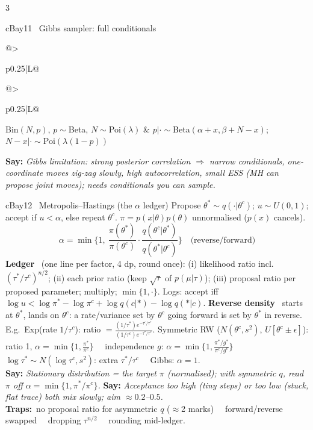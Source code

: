 \documentclass{article}
\newcommand{\h}[1]{{\bfseries #1}\ }
\newcommand{\say}[1]{{\color{cMC!75!black}\textbf{Say:}} \emph{#1}}
\newcommand{\trap}{{\color{cBay}\textbf{Traps:}}\ }
\newcommand{\sep}{\ \textbullet\ }
\begin{document}
\begin{multicols*}{3}
\begin{tb}{cBay}{11 \textbullet\ Gibbs sampler: full conditionals}
\begin{tabularx}{\linewidth}{@{}>{\raggedright\arraybackslash}p{0.25\linewidth}|L@{}}
\end{tabularx}\par\nointerlineskip
\begin{tabularx}{\linewidth}{@{}>{\raggedright\arraybackslash}p{0.25\linewidth}|L@{}}
Bin$(N,p)$, $p\sim$Beta, $N\sim$Poi$(\lambda)$ & $p|\cdot\sim$Beta$(\alpha+x,\beta+N-x)$; $N-x|\cdot\sim$Poi$(\lambda(1-p))$\\
\end{tabularx}
\say{Gibbs limitation: strong posterior correlation $\Rightarrow$ narrow conditionals, one-coordinate moves zig-zag slowly, high autocorrelation, small ESS (MH can propose joint moves); needs conditionals you can sample.}
\end{tb}

\begin{tb}{cBay}{12 \textbullet\ Metropolis--Hastings (the $\alpha$ ledger)}
Propose $\theta^*\sim q(\cdot|\theta^c)$; $u\sim U(0,1)$; accept if $u<\alpha$, else repeat $\theta^c$. $\pi=p(x|\theta)p(\theta)$ unnormalised ($p(x)$ cancels).
\[\alpha=\min\Big\{1,\ \frac{\pi(\theta^*)}{\pi(\theta^c)}\cdot\frac{q(\theta^c|\theta^*)}{q(\theta^*|\theta^c)}\Big\}\quad\text{(reverse/forward)}\]
\h{Ledger} (one line per factor, 4 dp, round once): (i) likelihood ratio incl.\ $(\tau^*/\tau^c)^{n/2}$; (ii) each prior ratio (keep $\sqrt\tau$ of $p(\mu|\tau)$); (iii) proposal ratio per proposed parameter; multiply; $\min\{1,\cdot\}$. Logs: accept iff $\log u<\log\pi^*-\log\pi^c+\log q(c|*)-\log q(*|c)$.
\h{Reverse density} starts at $\theta^*$, lands on $\theta^c$: a rate/variance set by $\theta^c$ going forward is set by $\theta^*$ in reverse. E.g.\ Exp(rate $1/\tau^c$): ratio $=\frac{(1/\tau^*)e^{-\tau^c/\tau^*}}{(1/\tau^c)e^{-\tau^*/\tau^c}}$.
Symmetric RW ($N(\theta^c,s^2)$, $U[\theta^c\pm\epsilon]$): ratio 1, $\alpha=\min\{1,\frac{\pi^*}{\pi^c}\}$ \sep independence $g$: $\alpha=\min\{1,\frac{\pi^*/g^*}{\pi^c/g^c}\}$ \sep $\log\tau^*\sim N(\log\tau^c,s^2)$: extra $\tau^*/\tau^c$ \sep Gibbs: $\alpha=1$.\\
\say{Stationary distribution = the target $\pi$ (normalised); with symmetric $q$, read $\pi$ off $\alpha=\min\{1,\pi^*/\pi^c\}$.} \say{Acceptance too high (tiny steps) or too low (stuck, flat trace) both mix slowly; aim $\approx0.2$--$0.5$.}\\
\trap no proposal ratio for asymmetric $q$ ($\approx$2 marks) \sep forward/reverse swapped \sep dropping $\tau^{n/2}$ \sep rounding mid-ledger.
\end{tb}


\end{multicols*}
\end{document}
